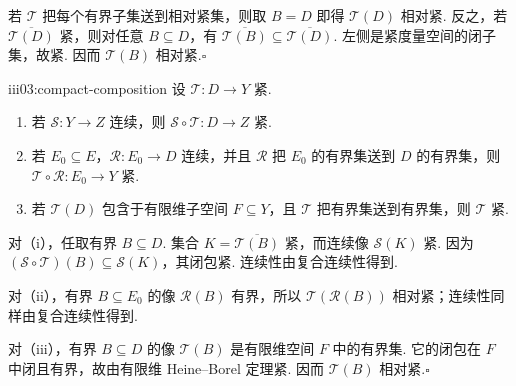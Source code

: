\begin{FAProof}
若 \(\displaystyle \mathcal T\) 把每个有界子集送到相对紧集，则取 \(\displaystyle B=D\) 即得 \(\displaystyle \mathcal T(D)\) 相对紧. 反之，若 \(\displaystyle \overline{\mathcal T(D)}\) 紧，则对任意 \(\displaystyle B\subseteq D\)，有 \(\displaystyle \overline{\mathcal T(B)}\subseteq\overline{\mathcal T(D)}\). 左侧是紧度量空间的闭子集，故紧. 因而 \(\displaystyle \mathcal T(B)\) 相对紧.\hfill\(\square\)

\end{FAProof}

\begin{FAProposition}[C][非线性紧映射的安全复合规则]{iii03:compact-composition}
设 \(\displaystyle \mathcal T:D\to Y\) 紧.
\begin{enumerate}[label=\textup{(\roman*)}]
\item 若 \(\displaystyle \mathcal S:Y\to Z\) 连续，则 \(\displaystyle \mathcal S\circ\mathcal T:D\to Z\) 紧.
\item 若 \(\displaystyle E_0\subseteq E\)，\(\displaystyle \mathcal R:E_0\to D\) 连续，并且 \(\displaystyle \mathcal R\) 把 \(\displaystyle E_0\) 的有界集送到 \(\displaystyle D\) 的有界集，则 \(\displaystyle \mathcal T\circ\mathcal R:E_0\to Y\) 紧.
\item 若 \(\displaystyle \mathcal T(D)\) 包含于有限维子空间 \(\displaystyle F\subseteq Y\)，且 \(\displaystyle \mathcal T\) 把有界集送到有界集，则 \(\displaystyle \mathcal T\) 紧.
\end{enumerate}
\end{FAProposition}

\begin{FAProof}
对（i），任取有界 \(\displaystyle B\subseteq D\). 集合 \(\displaystyle K=\overline{\mathcal T(B)}\) 紧，而连续像 \(\displaystyle \mathcal S(K)\) 紧. 因为 \(\displaystyle (\mathcal S\circ\mathcal T)(B)\subseteq\mathcal S(K)\)，其闭包紧. 连续性由复合连续性得到.

对（ii），有界 \(\displaystyle B\subseteq E_0\) 的像 \(\displaystyle \mathcal R(B)\) 有界，所以 \(\displaystyle \mathcal T(\mathcal R(B))\) 相对紧；连续性同样由复合连续性得到.

对（iii），有界 \(\displaystyle B\subseteq D\) 的像 \(\displaystyle \mathcal T(B)\) 是有限维空间 \(\displaystyle F\) 中的有界集. 它的闭包在 \(\displaystyle F\) 中闭且有界，故由有限维 Heine--Borel 定理紧. 因而 \(\displaystyle \mathcal T(B)\) 相对紧.\hfill\(\square\)

\end{FAProof}

